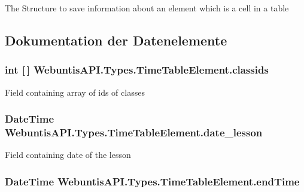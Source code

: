 The Structure to save information about an element which is a cell in a table 

\subsection{Dokumentation der Datenelemente}
\hypertarget{struct_webuntis_a_p_i_1_1_types_1_1_time_table_element_ab3f7530ba709811a0f080b9f25ee3b76}{
\subsubsection[{classids}]{\setlength{\rightskip}{0pt plus 5cm}int \mbox{[}$\,$\mbox{]} Webuntis\-A\-P\-I.\-Types.\-Time\-Table\-Element.\-classids}}\label{struct_webuntis_a_p_i_1_1_types_1_1_time_table_element_ab3f7530ba709811a0f080b9f25ee3b76}
Field containing array of ids of classes \hypertarget{struct_webuntis_a_p_i_1_1_types_1_1_time_table_element_a2ce093cea22aa8960523959541d15d02}{
\subsubsection[{date\-\_\-lesson}]{\setlength{\rightskip}{0pt plus 5cm}Date\-Time Webuntis\-A\-P\-I.\-Types.\-Time\-Table\-Element.\-date\-\_\-lesson}}\label{struct_webuntis_a_p_i_1_1_types_1_1_time_table_element_a2ce093cea22aa8960523959541d15d02}
Field containing date of the lesson \hypertarget{struct_webuntis_a_p_i_1_1_types_1_1_time_table_element_a0ef904dd3308b39f0ef4af265e428544}{
\subsubsection[{end\-Time}]{\setlength{\rightskip}{0pt plus 5cm}Date\-Time Webuntis\-A\-P\-I.\-Types.\-Time\-Table\-Element.\-end\-Time}}\label{struct_webuntis_a_p_i_1_1_types_1_1_time_table_element_a0ef904dd3308b39f0ef4af265e428544}
